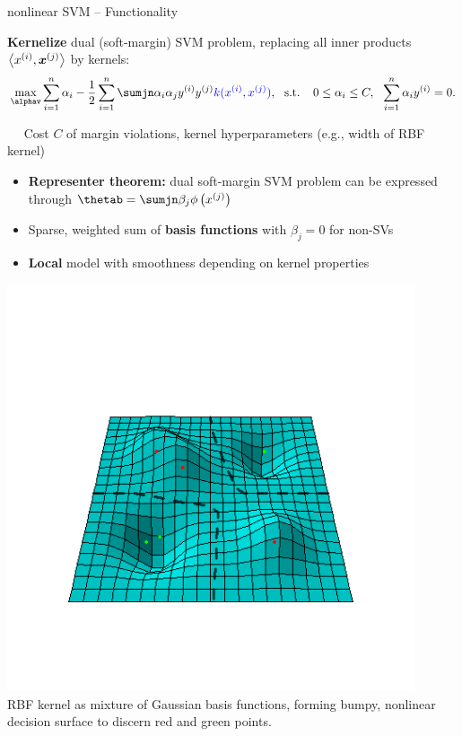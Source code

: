 \begin{frame}{nonlinear SVM -- Functionality}

\footnotesize


\textbf{Kernelize} dual (soft-margin) SVM problem, replacing all inner products 
$\left\langle x^{(i)}, \bm{x}^{(j)} \right\rangle$ by kernels:
$$\max_{\alphav} \sumin \alpha_i - \frac{1}{2}\sumin \sumjn
\alpha_i\alpha_j\yi y^{(j)} \textcolor{blue}{k(\xi, \xi[j])}, ~~ \text{s.t. } ~~ 
0 \le \alpha_i \le C, ~~ \sumin \alpha_i \yi = 0.
$$

\medskip

 ~~ Cost $C$ of margin violations, kernel 
hyperparameters (e.g., width of RBF kernel)

\medskip


\begin{minipage}[c]{0.5\textwidth}

  \begin{itemize}
    \item \textbf{Representer theorem:} dual soft-margin SVM problem can be 
    expressed through $\thetab = \sumjn \beta_j \phi \left(\xi[j] \right)$ \\
    \item Sparse, weighted sum of \textbf{basis functions} with $\beta_j = 0$ 
    for non-SVs
    \item \textbf{Local} model with smoothness depending on kernel properties
  \end{itemize}
\end{minipage}
\hfill
\begin{minipage}[c]{0.4\textwidth}
  \centering
  \includegraphics[width=0.9\textwidth, trim=0 70 0 100, clip]{
  ../slides/nonlinear-svm/figure/svm_rbf_as_basis.png} \\
  \tiny{RBF kernel as mixture of Gaussian basis functions, forming
  bumpy, nonlinear decision surface to discern red and green points.}
\end{minipage}


\end{frame}
